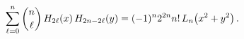 \[\sum_{\ell=0}^{n}\binom{n}{\ell}\mathop{H_{2\ell}\/}\nolimits\!\left(x\right)%
\mathop{H_{2n-2\ell}\/}\nolimits\!\left(y\right)=(-1)^{n}2^{2n}n!\mathop{L_{n}%
\/}\nolimits\!\left(x^{2}+y^{2}\right).\]